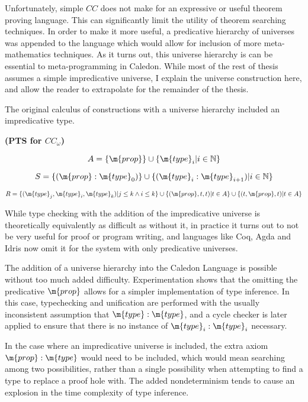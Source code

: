 Unfortunately, simple $CC$ does not make for an expressive or useful theorem proving language.  
This can significantly limit the utility of theorem searching techniques.  
In order to make it more useful, a predicative hierarchy of universes 
was appended to the language which would allow for inclusion of more meta-mathematics techniques.
As it turns out, this universe hierarchy is can be essential to meta-programming in Caledon.  
While most of the rest of thesis assumes a simple impredicative universe, I explain the 
universe construction here, and allow the reader to extrapolate for the remainder of the thesis.

The original calculus of constructions with a universe hierarchy included an impredicative type.  

\begin{definition}
\textbf{(PTS for $CC_\omega$)}

\[
A = \{ \m{prop} \} \cup \{ \m{type}_i | i \in \mathbb{N} \}
\]

\[
S =   \{ (\m{prop} : \m{type}_0 ) \}
 \cup \{ (\m{type}_i : \m{type}_{i+1} ) | i \in \mathbb{N} \}
\]

\[ 
R = \{ (\m{type}_j,\m{type}_i,\m{type}_k) | j \leq k \wedge i \leq k \}
\cup \{ (\m{prop},t,t) | t \in A \}
\cup \{ (t,\m{prop},t) | t \in A \}
\]

\label{coc:utypes}
\end{definition}

While type checking with the addition of the impredicative universe is theoretically equivalently as difficult 
as without it, in practice it turns out to not be very useful for proof or program writing, and 
languages like Coq, Agda and Idris now omit it for the system with only predicative universes.

The addition of a universe hierarchy into the Caledon Language is possible without too much added difficulty. 
Experimentation shows that the omitting the predicative $\m{prop}$ allows for a simpler implementation of type inference.
In this case, typechecking and unification are performed with the usually inconsistent assumption that
$\m{type} : \m{type}$, and a cycle checker is later applied to ensure that there is no instance of 
$\m{type}_i : \m{type}_i$ necessary.  

In the case where an impredicative universe is included, the extra axiom $\m{prop} : \m{type}$ would
need to be included, which would mean searching among two possibilities, rather than a single possibility 
when attempting to find a type to replace a proof hole with. 
The added nondeterminism tends to cause an explosion in the time complexity of type inference.
